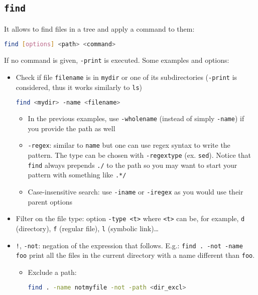 \documentclass[a4paper,12pt,%
              final%
              ]{article}
\begin{document}
\subsection{\texttt{find}}
\label{ssec:find}
It allows to find files in a tree and apply a command to them:
\begin{lstlisting}[language=bash]
find [options] <path> <command>
\end{lstlisting}
If no command is given, \texttt{-print} is executed. Some examples and options:
\begin{itemize}
  \item Check if file \texttt{filename} is in \texttt{mydir} or one of its subdirectories (\texttt{-print} is considered, thus it works similarly to \texttt{ls})
\begin{lstlisting}[language=bash]
find <mydir> -name <filename>
\end{lstlisting}
  \begin{itemize}
    \item In the previous examples, use \verb|-wholename| (instead of simply \verb|-name|) if you provide the path as well
    \item \verb|-regex|: similar to \texttt{name} but one can use regex syntax to write the pattern. The type can be chosen with \verb|-regextype| (ex. \texttt{sed}). Notice that \texttt{find} always prepends \verb|./| to the path so you may want to start your pattern with something like \verb|.*/|
    \item Case-insensitive search: use \verb|-iname| or \verb|-iregex| as you would use their parent options
  \end{itemize}
  \item Filter on the file type: option \verb|-type <t>| where \texttt{<t>} can be, for example, \texttt{d} (directory), \texttt{f} (regular file), \texttt{l} (symbolic link)\dots
  \item \texttt{!}, \texttt{-not}: negation of the expression that follows. E.g.: \texttt{find . -not -name foo} print all the files in the current directory with a name different than \texttt{foo}.
    \begin{itemize}
      \item Exclude a path:
\begin{lstlisting}[language=bash]
find . -name notmyfile -not -path <dir_excl>

\end{lstlisting}
\end{itemize}
\end{itemize}
\end{document}
